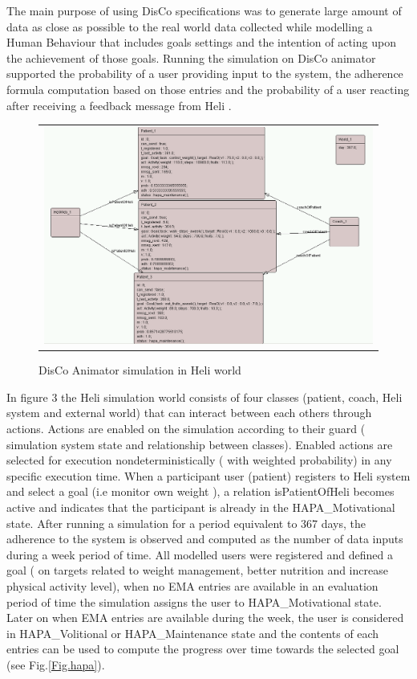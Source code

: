 \documentclass{llncs}
\begin{document}
The main purpose of using DisCo specifications was to generate large amount of data as close as possible to the real world data collected while modelling a Human Behaviour that includes goals settings and the intention of acting upon the achievement of those goals. Running the simulation on DisCo animator supported the probability of a user providing input to the system, the adherence formula computation based on those entries and the probability of a user reacting after receiving a feedback message from Heli  \cite{rem2017}.

 
\begin{figure}
  \begin{center}
  \begin{tabular}{c}
    \includegraphics[scale=0.3]{DisCoAnimator.png}\\
    \end{tabular}
    \caption{DisCo Animator simulation in Heli world}
     \label{Fig.Animator}
\end{center}
\end{figure} 

In figure 3 the Heli simulation world consists of  four classes (patient, coach, Heli system and external world) that  can interact between each others through actions. Actions are enabled on the simulation according to their guard ( simulation system state and relationship between classes). Enabled actions are selected  for execution nondeterministically ( with weighted probability) in any specific execution time. When a participant user (patient) registers to Heli system and select a goal (i.e monitor own weight ),  a relation isPatientOfHeli becomes active and indicates that the participant is already in the HAPA\_Motivational state.
After running a simulation for a period equivalent to 367 days, the adherence to the system is observed and computed as the number of data inputs during a week period of time.  All modelled users were registered and defined a goal ( on targets related to weight management, better nutrition and increase physical activity level), when no EMA entries are available in an evaluation period of time the simulation assigns the user to HAPA\_Motivational state. Later on when EMA entries are available during the week, the user is considered in HAPA\_Volitional or HAPA\_Maintenance state and the contents of each entries can be used to compute the progress over time towards the selected goal (see Fig.\ref{Fig.hapa}).
\end{document}
